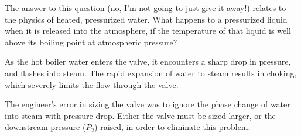The answer to this question (no, I'm not going to just give it away!) relates to the physics of heated, pressurized water.  What happens to a pressurized liquid when it is released into the atmosphere, if the temperature of that liquid is well above its boiling point at atmospheric pressure?
 






As the hot boiler water enters the valve, it encounters a sharp drop in pressure, and flashes into steam.  The rapid expansion of water to steam results in choking, which severely limits the flow through the valve.

The engineer's error in sizing the valve was to ignore the phase change of water into steam with pressure drop.  Either the valve must be sized larger, or the downstream pressure ($P_2$) raised, in order to eliminate this problem.




